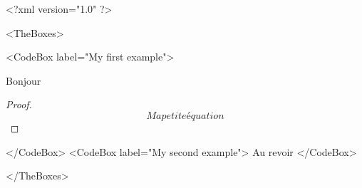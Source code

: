 <?xml version="1.0" ?>

<TheBoxes>

<CodeBox label="My first example">
	
\begin{proposition}
	Bonjour
\end{proposition}

\begin{proof}
	\begin{equation}
		Ma petite équation
	\end{equation}
	
\end{proof}


</CodeBox>
<CodeBox label="My second example">
	Au revoir
</CodeBox>

</TheBoxes>
